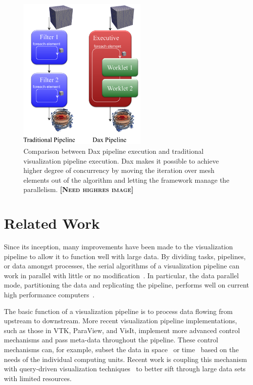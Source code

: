 \documentclass{vgtc}                          %
\newcommand*{\lcite}[1]{~\cite{#1}}
\newcommand{\fix}[1]{{\color{red}\textbf{\textsc{[#1]}}}}
\begin{document}
\begin{figure}
  \centering
  \includegraphics[width=2.5in]{images/DaxPipelineVsTraditionalPipeline}
  \caption{Comparison between Dax pipeline execution and traditional
    visualization pipeline execution. Dax makes it possible to achieve higher
    degree of concurrency by moving the iteration over mesh elements out of the
    algorithm and letting the framework manage the parallelism.
    \fix{Need highres image}}
  \label{fig:DaxPipelineVsTraditionalPipeline}
\end{figure}

\section{Related Work}
\label{sec:RelatedWork}

Since its inception, many improvements have been made to the visualization
pipeline to allow it to function well with large data.  By dividing tasks,
pipelines, or data amongst processes, the serial algorithms of a
visualization pipeline can work in parallel with little or no
modification\lcite{Ahrens00}.  In particular, the data parallel
mode, partitioning the data and replicating the pipeline, performs
well on current high performance computers\lcite{Cedilnik06}.

The basic function of a visualization pipeline is to process data flowing
from upstream to downstream.  More recent visualization pipeline
implementations, such as those in VTK, ParaView, and VisIt, implement more
advanced control mechanisms and pass meta-data throughout the pipeline.
These control mechanisms can, for example, subset the data in
space\lcite{Childs05} or time\lcite{Biddiscombe07} based on the needs of
the individual computing units.  Recent work is coupling this mechanism
with query-driven visualization techniques\lcite{Gosink08} to better sift
through large data sets with limited resources.
\end{document}
